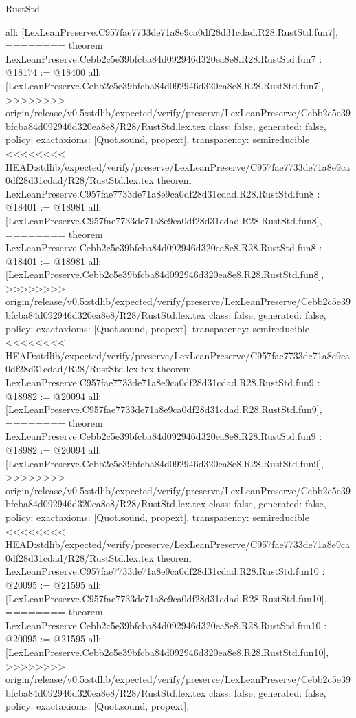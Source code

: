 \begin{lexlean}{RustStd}
\begin{coremodule}
{\begin{coremodule}
{{{{{{{{{{  all: [LexLeanPreserve.C957fae7733de71a8e9ca0df28d31cdad.R28.RustStd.fun7],
========
theorem LexLeanPreserve.Cebb2c5e39bfcba84d092946d320ea8e8.R28.RustStd.fun7 : @18174 := @18400 {
  all: [LexLeanPreserve.Cebb2c5e39bfcba84d092946d320ea8e8.R28.RustStd.fun7],
>>>>>>>> origin/release/v0.5:stdlib/expected/verify/preserve/LexLeanPreserve/Cebb2c5e39bfcba84d092946d320ea8e8/R28/RustStd.lex.tex
  class: false,
  generated: false,
  policy: exact{axioms: [Quot.sound, propext]},
  transparency: semireducible
}
<<<<<<<< HEAD:stdlib/expected/verify/preserve/LexLeanPreserve/C957fae7733de71a8e9ca0df28d31cdad/R28/RustStd.lex.tex
theorem LexLeanPreserve.C957fae7733de71a8e9ca0df28d31cdad.R28.RustStd.fun8 : @18401 := @18981 {
  all: [LexLeanPreserve.C957fae7733de71a8e9ca0df28d31cdad.R28.RustStd.fun8],
========
theorem LexLeanPreserve.Cebb2c5e39bfcba84d092946d320ea8e8.R28.RustStd.fun8 : @18401 := @18981 {
  all: [LexLeanPreserve.Cebb2c5e39bfcba84d092946d320ea8e8.R28.RustStd.fun8],
>>>>>>>> origin/release/v0.5:stdlib/expected/verify/preserve/LexLeanPreserve/Cebb2c5e39bfcba84d092946d320ea8e8/R28/RustStd.lex.tex
  class: false,
  generated: false,
  policy: exact{axioms: [Quot.sound, propext]},
  transparency: semireducible
}
<<<<<<<< HEAD:stdlib/expected/verify/preserve/LexLeanPreserve/C957fae7733de71a8e9ca0df28d31cdad/R28/RustStd.lex.tex
theorem LexLeanPreserve.C957fae7733de71a8e9ca0df28d31cdad.R28.RustStd.fun9 : @18982 := @20094 {
  all: [LexLeanPreserve.C957fae7733de71a8e9ca0df28d31cdad.R28.RustStd.fun9],
========
theorem LexLeanPreserve.Cebb2c5e39bfcba84d092946d320ea8e8.R28.RustStd.fun9 : @18982 := @20094 {
  all: [LexLeanPreserve.Cebb2c5e39bfcba84d092946d320ea8e8.R28.RustStd.fun9],
>>>>>>>> origin/release/v0.5:stdlib/expected/verify/preserve/LexLeanPreserve/Cebb2c5e39bfcba84d092946d320ea8e8/R28/RustStd.lex.tex
  class: false,
  generated: false,
  policy: exact{axioms: [Quot.sound, propext]},
  transparency: semireducible
}
<<<<<<<< HEAD:stdlib/expected/verify/preserve/LexLeanPreserve/C957fae7733de71a8e9ca0df28d31cdad/R28/RustStd.lex.tex
theorem LexLeanPreserve.C957fae7733de71a8e9ca0df28d31cdad.R28.RustStd.fun10 : @20095 := @21595 {
  all: [LexLeanPreserve.C957fae7733de71a8e9ca0df28d31cdad.R28.RustStd.fun10],
========
theorem LexLeanPreserve.Cebb2c5e39bfcba84d092946d320ea8e8.R28.RustStd.fun10 : @20095 := @21595 {
  all: [LexLeanPreserve.Cebb2c5e39bfcba84d092946d320ea8e8.R28.RustStd.fun10],
>>>>>>>> origin/release/v0.5:stdlib/expected/verify/preserve/LexLeanPreserve/Cebb2c5e39bfcba84d092946d320ea8e8/R28/RustStd.lex.tex
  class: false,
  generated: false,
  policy: exact{axioms: [Quot.sound, propext]},
}}}}}}}}}}}}}}
\end{coremodule}}
\end{coremodule}
\end{lexlean}
